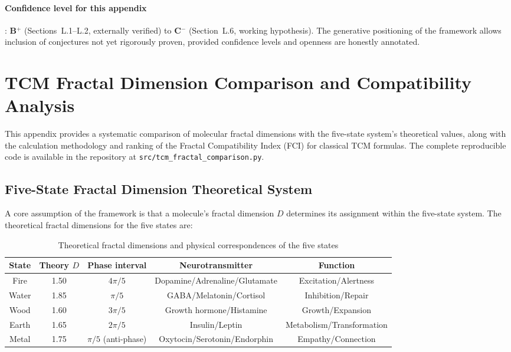 \documentclass[12pt,a4paper,twocolumn]{article}
\begin{document}
\paragraph{Confidence level for this appendix}: \textbf{B$^+$} (Sections~L.1--L.2, externally verified) to \textbf{C$^-$} (Section~L.6, working hypothesis). The generative positioning of the framework allows inclusion of conjectures not yet rigorously proven, provided confidence levels and openness are honestly annotated.


\section{TCM Fractal Dimension Comparison and Compatibility Analysis}
\label{app:tcm_comparison}

This appendix provides a systematic comparison of molecular fractal dimensions with the five-state system's theoretical values, along with the calculation methodology and ranking of the Fractal Compatibility Index (FCI) for classical TCM formulas. The complete reproducible code is available in the repository at \texttt{src/tcm\_fractal\_comparison.py}.

\subsection{Five-State Fractal Dimension Theoretical System}
\label{subsec:five_states_theory_en}

A core assumption of the framework is that a molecule's fractal dimension $D$ determines its assignment within the five-state system. The theoretical fractal dimensions for the five states are:
\begin{table}[H]
\centering
\caption{Theoretical fractal dimensions and physical correspondences of the five states}
\begin{tabular}{c|c|c|c|c}
\hline
\textbf{State} & \textbf{Theory $D$} & \textbf{Phase interval} & \textbf{Neurotransmitter} & \textbf{Function} \\
\hline
Fire & 1.50 & $4\pi/5$ & Dopamine/Adrenaline/Glutamate & Excitation/Alertness \\
Water & 1.85 & $\pi/5$ & GABA/Melatonin/Cortisol & Inhibition/Repair \\
Wood & 1.60 & $3\pi/5$ & Growth hormone/Histamine & Growth/Expansion \\
Earth & 1.65 & $2\pi/5$ & Insulin/Leptin & Metabolism/Transformation \\
Metal & 1.75 & $\pi/5$ (anti-phase) & Oxytocin/Serotonin/Endorphin & Empathy/Connection \\
\hline
\end{tabular}
\end{table}
\end{document}
